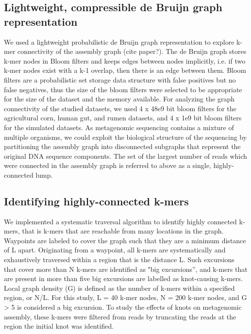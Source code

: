 \documentclass[11pt]{article} %
\begin{document}
\subsection{Lightweight, compressible de Bruijn graph representation}

We used a lightweight probabilistic de Bruijn graph representation to explore k-mer connectivity of the assembly graph (cite paper?). The de Bruijn graph stores k-mer nodes in Bloom filters and keeps edges between nodes implicitly, i.e. if two k-mer nodes exist with a k-1 overlap, then there is an edge between them. Bloom filters are a probabilistic set storage data structure with false positives but no false negatives, thus the size of the bloom filters were selected to be appropriate for the size of the dataset and the memory available. For analyzing the graph connectivity of the studied datasets, we used 4 x 48e9 bit bloom filters for the agricultural corn, human gut, and rumen datasets, and 4 x 1e9 bit bloom filters for the simulated datasets.  As metagenomic sequencing contains a mixture of multiple organisms, we could exploit the biological structure of the sequencing by partitioning the assembly graph into disconnected subgraphs that represent the
original DNA sequence components. The set of the largest number of reads which were connected in the assembly graph is referred to above as a single, highly-connected lump. 

\subsection{Identifying highly-connected k-mers}

We implemented a systematic traversal algorithm to identify highly connected k-mers, that is k-mers that are reachable from many locations in the graph. Waypoints are labeled to cover the graph such that they are a minimum distance of L apart. Originating from a waypoint, all k-mers are systematically and exhaustively traversed within a region that is the distance L. Such excursions that cover more than N k-mers are identified as "big excursions'', and k-mers that are present in more than five big excursions are labelled as knot-causing k-mers. Local graph density (G) is defined as the number of k-mers within a specified region, or N/L. For this study, L = 40 k-mer nodes, N = 200 k-mer nodes, and G > 5 is considered a big excursion. To study the effects of knots on metagenomic assembly, these k-mers were filtered from reads by truncating the reads at the region the initial knot was identified.
\end{document}
